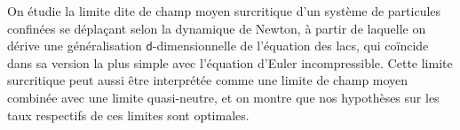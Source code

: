\documentclass[JEP,XML,SOM,Unicode,published]{cedram}
\theoremstyle{plain}
\theoremstyle{definition}
\begin{document}


\begin{altabstract}
On étudie la limite dite de champ moyen surcritique d'un système de particules confinées se déplaçant selon la dynamique de Newton, à partir de laquelle on dérive une généralisation $\mathsf{d}$\nobreakdash-dimensionnelle de l'équation des lacs, qui coïncide dans sa version la plus simple avec l'équation d'Euler incompressible. Cette limite surcritique peut aussi être interprétée comme une limite de champ moyen combinée avec une limite quasi-neutre, et on montre que nos hypothèses sur les taux respectifs de ces limites sont optimales.
\end{altabstract}

\maketitle
\vspace*{-\baselineskip}
\tableofcontents
\end{document}
